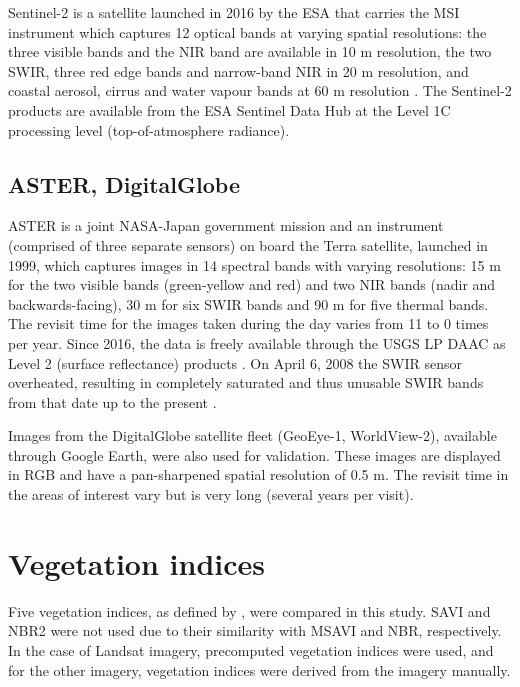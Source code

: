 \documentclass[a4paper,12pt]{scrbook}
\begin{document}
Sentinel-2 is a satellite launched in 2016 by the \ac{ESA} that carries the \ac{MSI} instrument which captures 12 optical bands at varying spatial resolutions: the three visible bands and the \ac{NIR} band are available in 10 m resolution, the two \ac{SWIR}, three red edge bands and narrow-band \ac{NIR} in 20 m resolution, and coastal aerosol, cirrus and water vapour bands at 60 m resolution \citep{suhet_sentinel-2_2015}. The Sentinel-2 products are available from the \ac{ESA} Sentinel Data Hub at the Level 1C processing level (top-of-atmosphere radiance).

\subsection{ASTER, DigitalGlobe}

\ac{ASTER} is a joint NASA-Japan government mission and an instrument (comprised of three separate sensors) on board the Terra satellite, launched in 1999, which captures images in 14 spectral bands with varying resolutions: 15 m for the two visible bands (green-yellow and red) and two \ac{NIR} bands (nadir and backwards-facing), 30 m for six \ac{SWIR} bands and 90 m for five thermal bands. The revisit time for the images taken during the day varies from 11 to 0 times per year. Since 2016, the data is freely available through the \ac{USGS} \ac{LP DAAC} as Level 2 (surface reflectance) products \citep{nasa_lp_daac_aster_2006}. On April 6, 2008 the \ac{SWIR} sensor overheated, resulting in completely saturated and thus unusable \ac{SWIR} bands from that date up to the present \citep{meyer_advanced_2015}.

Images from the DigitalGlobe satellite fleet (GeoEye-1, WorldView-2), available through Google Earth, were also used for validation. These images are displayed in \ac{RGB} and have a pan-sharpened spatial resolution of 0.5 m. The revisit time in the areas of interest vary but is very long (several years per visit).

\section{Vegetation indices}

Five vegetation indices, as defined by \citet{u.s._geological_survey_product_2017_3}, were compared in this study. \ac{SAVI} and \ac{NBR2} were not used due to their similarity with \ac{MSAVI} and \ac{NBR}, respectively. In the case of Landsat imagery, precomputed vegetation indices were used, and for the other imagery, vegetation indices were derived from the imagery manually.
\end{document}

